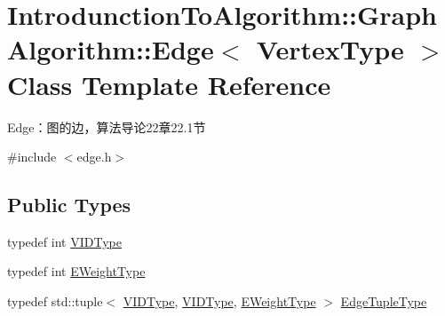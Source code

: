 \hypertarget{class_introdunction_to_algorithm_1_1_graph_algorithm_1_1_edge}{}\section{Introdunction\+To\+Algorithm\+:\+:Graph\+Algorithm\+:\+:Edge$<$ Vertex\+Type $>$ Class Template Reference}
\label{class_introdunction_to_algorithm_1_1_graph_algorithm_1_1_edge}


Edge：图的边，算法导论22章22.1节  




{\ttfamily \#include $<$edge.\+h$>$}

\subsection*{Public Types}
\begin{DoxyCompactItemize}
\item 
typedef int \hyperlink{class_introdunction_to_algorithm_1_1_graph_algorithm_1_1_edge_afe54a3bbe1f907ed578054641bf8ea07}{V\+I\+D\+Type}
\item 
typedef int \hyperlink{class_introdunction_to_algorithm_1_1_graph_algorithm_1_1_edge_a34045c46a299bb27dab97ba7e3c554c3}{E\+Weight\+Type}
\item 
typedef std\+::tuple$<$ \hyperlink{class_introdunction_to_algorithm_1_1_graph_algorithm_1_1_edge_afe54a3bbe1f907ed578054641bf8ea07}{V\+I\+D\+Type}, \hyperlink{class_introdunction_to_algorithm_1_1_graph_algorithm_1_1_edge_afe54a3bbe1f907ed578054641bf8ea07}{V\+I\+D\+Type}, \hyperlink{class_introdunction_to_algorithm_1_1_graph_algorithm_1_1_edge_a34045c46a299bb27dab97ba7e3c554c3}{E\+Weight\+Type} $>$ \hyperlink{class_introdunction_to_algorithm_1_1_graph_algorithm_1_1_edge_adaaedd6d4205248ecf521e8585a2ecf6}{Edge\+Tuple\+Type}
\end{DoxyCompactItemize}
